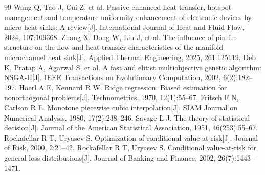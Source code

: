 \documentclass[12pt,a4paper]{article}
\begin{document}
\newpage
\renewcommand{\refname}{\centering 参考文献}
\begin{thebibliography}{99}
 Wang Q, Tao J, Cui Z, et al. Passive enhanced heat transfer, hotspot management and temperature uniformity enhancement of electronic devices by micro heat sinks: A review[J]. International Journal of Heat and Fluid Flow, 2024, 107:109368.
 Zhang X, Dong W, Liu J, et al. The influence of pin fin structure on the flow and heat transfer characteristics of the manifold microchannel heat sink[J]. Applied Thermal Engineering, 2025, 261:125119.
 Deb K, Pratap A, Agarwal S, et al. A fast and elitist multiobjective genetic algorithm: NSGA-II[J]. IEEE Transactions on Evolutionary Computation, 2002, 6(2):182--197.
 Hoerl A E, Kennard R W. Ridge regression: Biased estimation for nonorthogonal problems[J]. Technometrics, 1970, 12(1):55--67.
 Fritsch F N, Carlson R E. Monotone piecewise cubic interpolation[J]. SIAM Journal on Numerical Analysis, 1980, 17(2):238--246.
 Savage L J. The theory of statistical decision[J]. Journal of the American Statistical Association, 1951, 46(253):55--67.
 Rockafellar R T, Uryasev S. Optimization of conditional value-at-risk[J]. Journal of Risk, 2000, 2:21--42.
 Rockafellar R T, Uryasev S. Conditional value-at-risk for general loss distributions[J]. Journal of Banking and Finance, 2002, 26(7):1443--1471.
\end{thebibliography}
\end{document}
